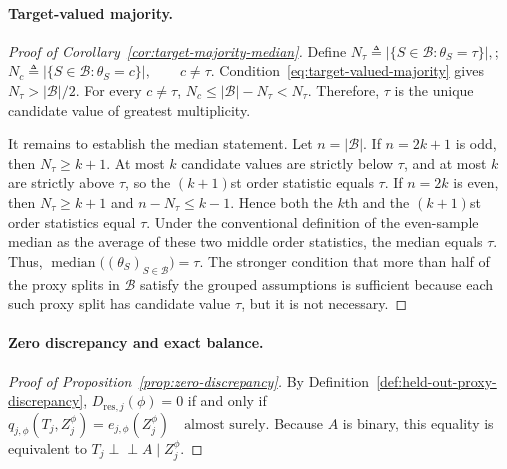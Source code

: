 \paragraph{Target-valued majority.}
\begin{proof}[Proof of Corollary~\ref{cor:target-majority-median}]
Define
\(N_\tau \triangleq \bigl|\{S\in\mathcal B:\theta_S=\tau\}\bigr|,\); \(N_c \triangleq \bigl|\{S\in\mathcal B:\theta_S=c\}\bigr|, \qquad c\ne\tau.\)
Condition~\eqref{eq:target-valued-majority} gives $N_\tau>|\mathcal B|/2$. For every $c\ne\tau$,
\(N_c \le |\mathcal B|-N_\tau < N_\tau.\)
Therefore, $\tau$ is the unique candidate value of greatest multiplicity.

It remains to establish the median statement. Let $n=|\mathcal B|$. If $n=2k+1$ is odd, then $N_\tau\ge k+1$. At most $k$ candidate values are strictly below $\tau$, and at most $k$ are strictly above $\tau$, so the $(k+1)$st order statistic equals $\tau$. If $n=2k$ is even, then $N_\tau\ge k+1$ and $n-N_\tau\le k-1$. Hence both the $k$th and the $(k+1)$st order statistics equal $\tau$. Under the conventional definition of the even-sample median as the average of these two middle order statistics, the median equals $\tau$. Thus,
\(\operatorname{median}\bigl((\theta_S)_{S\in\mathcal B}\bigr)=\tau.\)
The stronger condition that more than half of the proxy splits in $\mathcal B$ satisfy the grouped assumptions is sufficient because each such proxy split has candidate value $\tau$, but it is not necessary.
\end{proof}

\paragraph{Zero discrepancy and exact balance.}
\begin{proof}[Proof of Proposition~\ref{prop:zero-discrepancy}]
By Definition~\ref{def:held-out-proxy-discrepancy}, $D_{\mathrm{res},j}(\phi)=0$ if and only if
\(q_{j,\phi}(T_j,Z_j^\phi)=e_{j,\phi}(Z_j^\phi) \quad\text{almost surely}.\)
Because $A$ is binary, this equality is equivalent to $T_j\perp\!\!\!\perp A\mid Z_j^\phi$.
\end{proof}

